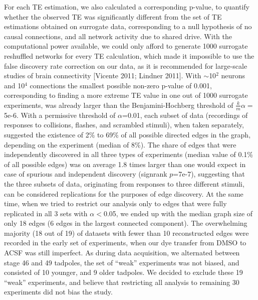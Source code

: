 \documentclass{article}
\begin{document}
For each TE estimation, we also calculated a corresponding p-value, to quantify whether the observed TE was significantly different from the set of TE estimations obtained on surrogate data, corresponding to a null hypothesis of no causal connections, and all network activity due to shared drive. With the computational power available, we could only afford to generate 1000 surrogate reshuffled networks for every TE calculation, which made it impossible to use the false discovery rate correction on our data, as it is recommended for large-scale studies of brain connectivity [Vicente 2011; Lindner 2011]. With $\sim$10$^2$ neurons and 10$^4$ connections the smallest possible non-zero p-value of 0.001, corresponding to finding a more extreme TE value in one out of 1000 surrogate experiments, was already larger than the Benjamini-Hochberg threshold of $\frac{k}{m}\alpha=$5e-6. With a permissive threshold of $\alpha$=0.01, each subset of data (recordings of responses to collisions, flashes, and scrambled stimuli), when taken separately, suggested the existence of 2\% to 69\% of all possible directed edges in the graph, depending on the experiment (median of 8\%). The share of edges that were independently discovered in all three types of experiments (median value of 0.1\% of all possible edges) was on average 1.8 times larger than one would expect in case of spurious and independent discovery (signrank $p$=7e-7), suggesting that the three subsets of data, originating from responses to three different stimuli, can be considered replications for the purposes of edge discovery. At the same time, when we tried to restrict our analysis only to edges that were fully replicated in all 3 sets with $\alpha < $0.05, we ended up with the median graph size of only 18 edges (6 edges in the largest connected component). The overwhelming majority (18 out of 19) of datasets with fewer than 10 reconstructed edges were recorded in the early set of experiments, when our dye transfer from DMSO to ACSF was still imperfect. As during data acquisition, we alternated between stage 46 and 49 tadpoles, the set of “weak” experiments was not biased, and consisted of 10 younger, and 9 older tadpoles. We decided to exclude these 19 “weak” experiments, and believe that restricting all analysis to remaining 30 experiments did not bias the study.
\end{document}

